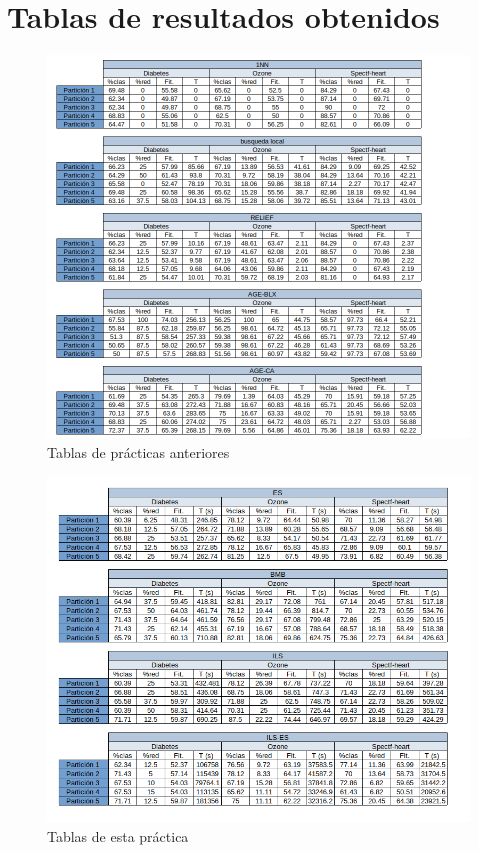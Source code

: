 \documentclass[12pt, spanish]{article}
\begin{document}
\pagebreak

\section{Tablas de resultados obtenidos}
\begin{figure}[htbp]
  \centering
  \includegraphics[width=\textwidth]{tables1.png}
  \caption{Tablas de prácticas anteriores}
  \label{fig:imagen}
\end{figure}

\begin{figure}[htbp]
  \centering
  \includegraphics[width=\textwidth]{tables2.png}
  \caption{Tablas de esta práctica}
  \label{fig:imagen}
\end{figure}
\end{document}
